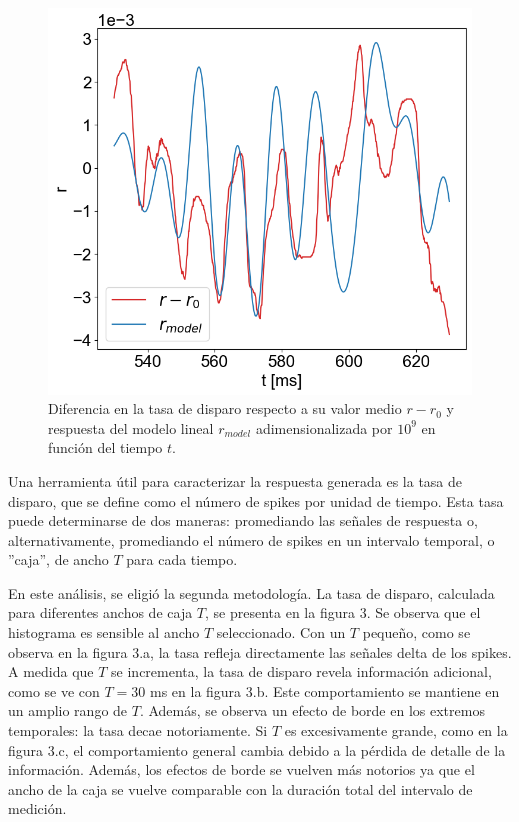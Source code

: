 \documentclass[aps,prb,twocolumn,superscriptaddress,floatfix,longbibliography]{revtex4-2}
\newcounter{para}
\begin{document}
\begin{figure}[h]
  \includegraphics[clip=true,width=0.8\columnwidth]{r_vs_r_model.png}
  \caption{Diferencia en la tasa de disparo respecto a su valor medio $r - r_0$ y respuesta del modelo lineal $r_{model}$ adimensionalizada por $10^9$ en función del tiempo $t$.}
   \label{fig:r_vs_r_model}
\end{figure}


Una herramienta útil para caracterizar la respuesta generada es la tasa de disparo, que se define como el número de spikes por unidad de tiempo. Esta tasa puede determinarse de dos maneras: promediando las señales de respuesta o, alternativamente, promediando el número de spikes en un intervalo temporal, o ''caja'', de ancho \(T\) para cada tiempo.

En este análisis, se eligió la segunda metodología. La tasa de disparo, calculada para diferentes anchos de caja \(T\), se presenta en la figura 3. Se observa que el histograma es sensible al ancho \(T\) seleccionado. Con un \(T\) pequeño, como se observa en la figura 3.a, la tasa refleja directamente las señales delta de los spikes. A medida que \(T\) se incrementa, la tasa de disparo revela información adicional, como se ve con \(T = 30\) ms en la figura 3.b. Este comportamiento se mantiene en un amplio rango de $T$. Además, se observa un efecto de borde en los extremos temporales: la tasa decae notoriamente. Si \(T\) es excesivamente grande, como en la figura 3.c, el comportamiento general cambia debido a la pérdida de detalle de la información. Además, los efectos de borde se vuelven más notorios ya que el ancho de la caja se vuelve comparable con la duración total del intervalo de medición.
\end{document}

